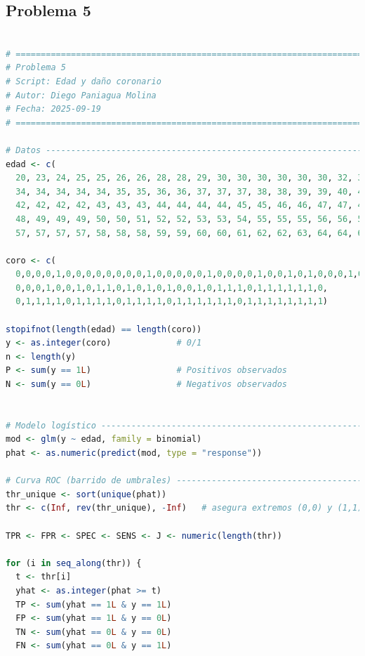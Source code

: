 \clearpage

\subsection{Problema \textcolor{CIMATRed}{5}}

\begin{lstlisting}[language=R, caption={Script: Edad y daño coronario}, label={lst:script4}]

# =============================================================================
# Problema 5
# Script: Edad y daño coronario
# Autor: Diego Paniagua Molina
# Fecha: 2025-09-19
# =============================================================================

# Datos -----------------------------------------------------------------------
edad <- c(
  20, 23, 24, 25, 25, 26, 26, 28, 28, 29, 30, 30, 30, 30, 30, 30, 32, 32, 33, 33, 
  34, 34, 34, 34, 34, 35, 35, 36, 36, 37, 37, 37, 38, 38, 39, 39, 40, 40, 41, 41, 
  42, 42, 42, 42, 43, 43, 43, 44, 44, 44, 44, 45, 45, 46, 46, 47, 47, 47, 48, 48, 
  48, 49, 49, 49, 50, 50, 51, 52, 52, 53, 53, 54, 55, 55, 55, 56, 56, 56, 57, 57, 
  57, 57, 57, 57, 58, 58, 58, 59, 59, 60, 60, 61, 62, 62, 63, 64, 64, 65, 69)

coro <- c(
  0,0,0,0,1,0,0,0,0,0,0,0,0,1,0,0,0,0,0,1,0,0,0,0,1,0,0,1,0,1,0,0,0,1,0,1,0,
  0,0,0,1,0,0,1,0,1,1,0,1,0,1,0,1,0,0,1,0,1,1,1,0,1,1,1,1,1,1,0,
  0,1,1,1,1,0,1,1,1,1,0,1,1,1,1,0,1,1,1,1,1,1,0,1,1,1,1,1,1,1,1)

stopifnot(length(edad) == length(coro))
y <- as.integer(coro)             # 0/1
n <- length(y)
P <- sum(y == 1L)                 # Positivos observados
N <- sum(y == 0L)                 # Negativos observados


# Modelo logístico ------------------------------------------------------------
mod <- glm(y ~ edad, family = binomial)
phat <- as.numeric(predict(mod, type = "response"))

# Curva ROC (barrido de umbrales) ---------------------------------------------
thr_unique <- sort(unique(phat))
thr <- c(Inf, rev(thr_unique), -Inf)   # asegura extremos (0,0) y (1,1)

TPR <- FPR <- SPEC <- SENS <- J <- numeric(length(thr))

for (i in seq_along(thr)) {
  t <- thr[i]
  yhat <- as.integer(phat >= t)
  TP <- sum(yhat == 1L & y == 1L)
  FP <- sum(yhat == 1L & y == 0L)
  TN <- sum(yhat == 0L & y == 0L)
  FN <- sum(yhat == 0L & y == 1L)
  

\end{lstlisting}
